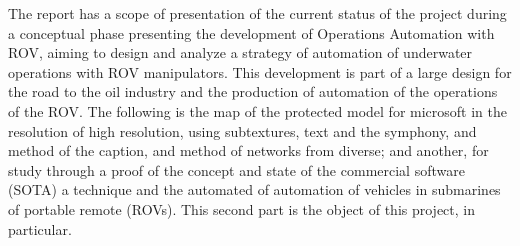 \documentclass[
12pt,					%
openright,				%
twoside,				%
a4paper,				%
english,
brazil
]{ABNT/abntex2_report}
\begin{document}
	\vspace*{1cm}
	\newpage
	\ABNTEXchapterfont\large\textbf{\resumobtitlename}
	\begin{flushleft}
		\normalsize
		\justify
		\normalfont
		The report has a scope of presentation of the current status of the project during a conceptual phase presenting the development of Operations Automation with ROV, aiming to design and analyze a strategy of automation of underwater operations with ROV manipulators. This development is part of a large design for the road to the oil industry and the production of automation of the operations of the ROV. The following is the map of the protected model for microsoft in the resolution of high resolution, using subtextures, text and the symphony, and method of the caption, and method of networks from diverse; and another, for study through a proof of the concept and state of the commercial software (SOTA) a technique and the automated of automation of vehicles in submarines of portable remote (ROVs). This second part is the object of this project, in particular. 	
	\end{flushleft}
	\clearpage
	\begin{flushleft}
		\ABNTEXchapterfont\Large\textbf{\MakeUppercase\listadefigurasname}
	\end{flushleft}
	\vspace*{-36pt}
	\pdfbookmark[0]{\listfigurename}{lof}
	\normalsize
	\listoffigures*
	\cleardoublepage
	\begin{flushleft}
		\ABNTEXchapterfont\Large\textbf{\MakeUppercase\listadetabelasname}
	\end{flushleft}
	\vspace*{-36pt}
	\pdfbookmark[0]{\listtablename}{lot}
	\normalsize
	\listoftables*
	\cleardoublepage
	\begin{flushleft}
	\ABNTEXchapterfont\Large\textbf{\MakeUppercase\listadesimbolsabrevtitlename}
		\noindent
		\vspace*{-06pt}
		\pdfbookmark[0]{\listadesiglasname}{lot}
		\normalsize
		\normalfont
		\aclist[list=acronyms]
	\end{flushleft}
\end{document}
